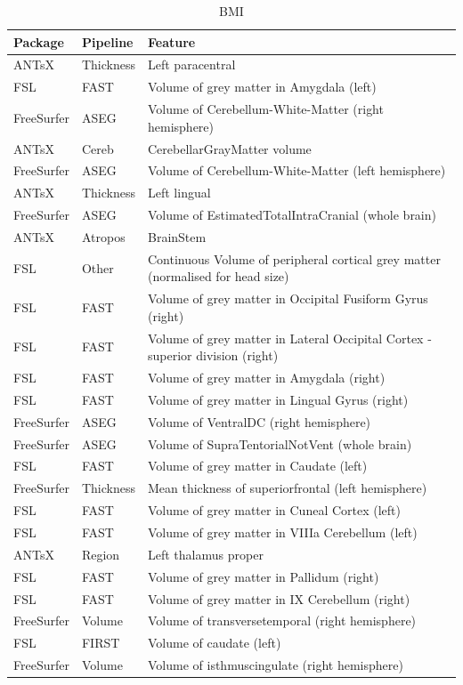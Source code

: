 \documentclass[
  10pt,
]{article}
\begin{document}
\begin{table}

\caption{\label{tab:compare-predictions}BMI}
\centering
\begin{tabular}[t]{lll}
\toprule
Package & Pipeline & Feature\\
\midrule
ANTsX & Thickness & Left paracentral\\
FSL & FAST & Volume of grey matter in Amygdala (left)\\
FreeSurfer & ASEG & Volume of Cerebellum-White-Matter (right hemisphere)\\
ANTsX & Cereb & CerebellarGrayMatter volume\\
FreeSurfer & ASEG & Volume of Cerebellum-White-Matter (left hemisphere)\\
\addlinespace
ANTsX & Thickness & Left lingual\\
FreeSurfer & ASEG & Volume of EstimatedTotalIntraCranial (whole brain)\\
ANTsX & Atropos & BrainStem\\
FSL & Other & Continuous    Volume of peripheral cortical grey matter (normalised for head size)\\
FSL & FAST & Volume of grey matter in Occipital Fusiform Gyrus (right)\\
\addlinespace
FSL & FAST & Volume of grey matter in Lateral Occipital Cortex - superior division (right)\\
FSL & FAST & Volume of grey matter in Amygdala (right)\\
FSL & FAST & Volume of grey matter in Lingual Gyrus (right)\\
FreeSurfer & ASEG & Volume of VentralDC (right hemisphere)\\
FreeSurfer & ASEG & Volume of SupraTentorialNotVent (whole brain)\\
\addlinespace
FSL & FAST & Volume of grey matter in Caudate (left)\\
FreeSurfer & Thickness & Mean thickness of superiorfrontal (left hemisphere)\\
FSL & FAST & Volume of grey matter in Cuneal Cortex (left)\\
FSL & FAST & Volume of grey matter in VIIIa Cerebellum (left)\\
ANTsX & Region & Left thalamus proper\\
\addlinespace
FSL & FAST & Volume of grey matter in Pallidum (right)\\
FSL & FAST & Volume of grey matter in IX Cerebellum (right)\\
FreeSurfer & Volume & Volume of transversetemporal (right hemisphere)\\
FSL & FIRST & Volume of caudate (left)\\
FreeSurfer & Volume & Volume of isthmuscingulate (right hemisphere)\\
\bottomrule
\end{tabular}
\end{table}
\end{document}
